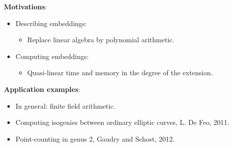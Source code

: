 \documentclass[10pt]{beamer}
\begin{document}
\begin{frame}
	
	
	\vspace*{3mm}
	\textbf{Motivations}:
	\begin{itemize}
		\item Describing embeddings:
		\begin{itemize}
			\item Replace linear algebra by polynomial arithmetic.
		\end{itemize}
		\item Computing embeddings:
		\begin{itemize}
			\item Quasi-linear time and memory in the degree of the	extension.
		\end{itemize}
	\end{itemize}
	
	\vspace*{3mm}
	\textbf{Application examples}:
	\begin{itemize}
		\item In general: finite field arithmetic.
		\item Computing isogenies between ordinary elliptic curves, L. De Feo, 2011.
		\item Point-counting in genus 2, Gaudry and Schost, 2012.
	\end{itemize}
	
\end{frame}
\end{document}
